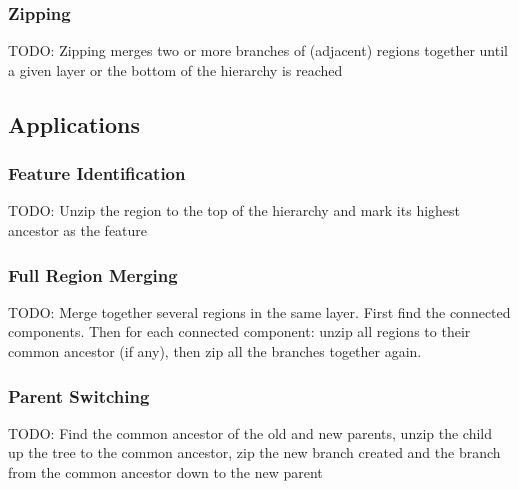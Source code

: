 \subsubsection{Zipping}

TODO: Zipping merges two or more branches of (adjacent) regions together until a given layer or the bottom of the hierarchy is reached

\subsection{Applications}

\subsubsection{Feature Identification}

TODO: Unzip the region to the top of the hierarchy and mark its highest ancestor as the feature

\subsubsection{Full Region Merging}

TODO: Merge together several regions in the same layer. First find the connected components. Then for each connected component: unzip all regions to their common ancestor (if any), then zip all the branches together again.

\subsubsection{Parent Switching}

TODO: Find the common ancestor of the old and new parents, unzip the child up the tree to the common ancestor, zip the new branch created and the branch from the common ancestor down to the new parent
